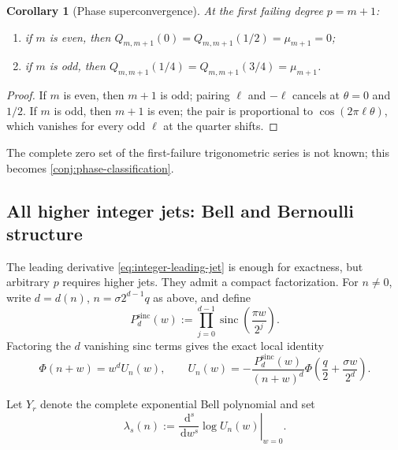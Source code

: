 \documentclass[11pt]{article}
\newtheorem{corollary}[theorem]{Corollary}
\theoremstyle{definition}
\DeclareMathOperator{\sinc}{sinc}
\newcommand{\dd}{\,\mathrm{d}}
\begin{document}
\begin{corollary}[Phase superconvergence]
\label{cor:phase-super}
At the first failing degree $p=m+1$:
\begin{enumerate}[label=(\roman*),leftmargin=2em]
\item if $m$ is even, then
$Q_{m,m+1}(0)=Q_{m,m+1}(1/2)=\mu_{m+1}=0$;
\item if $m$ is odd, then
$Q_{m,m+1}(1/4)=Q_{m,m+1}(3/4)=\mu_{m+1}$.
\end{enumerate}
\end{corollary}

\begin{proof}
If $m$ is even, then $m+1$ is odd; pairing $\ell$ and $-\ell$ cancels at
$\theta=0$ and $1/2$.  If $m$ is odd, then $m+1$ is even; the pair is
proportional to $\cos(2\pi\ell\theta)$, which vanishes for every odd $\ell$ at
the quarter shifts.
\end{proof}

The complete zero set of the first-failure trigonometric series is not known;
this becomes \cref{conj:phase-classification}.

\subsection{All higher integer jets: Bell and Bernoulli structure}

The leading derivative \eqref{eq:integer-leading-jet} is enough for exactness,
but arbitrary $p$ requires higher jets.  They admit a compact factorization.
For $n\ne0$, write $d=d(n)$, $n=\sigma2^{d-1}q$ as above, and define
\begin{equation}
 P_d^{\mathrm{sinc}}(w)
 :=\prod_{j=0}^{d-1}\sinc\!\left(\frac{\pi w}{2^j}\right).
 \label{eq:finite-sinc-block}
\end{equation}
Factoring the $d$ vanishing sinc terms gives the exact local identity
\begin{equation}
 \Phi(n+w)=w^d U_n(w),
 \qquad
 U_n(w)=-\frac{P_d^{\mathrm{sinc}}(w)}{(n+w)^d}
 \Phi\!\left(\frac q2+\frac{\sigma w}{2^d}\right).
 \label{eq:local-factorization}
\end{equation}

Let $Y_r$ denote the complete exponential Bell polynomial and set
\[
 \lambda_s(n):=\left.\frac{\dd^s}{\dd w^s}\log U_n(w)\right|_{w=0}.
\]
\end{document}
